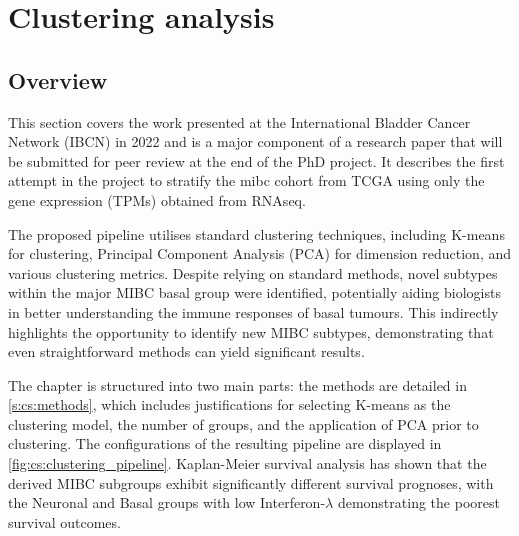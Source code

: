 \section{Clustering analysis} \label{s:clustering_analysis}

\vspace{3mm}
\vspace{3mm}

\subsection{Overview}

This section covers the work presented at the International Bladder Cancer Network (IBCN) in 2022 and is a major component of a research paper that will be submitted for peer review at the end of the PhD project. It describes the first attempt in the project to stratify the \acrfull{mibc} cohort from TCGA using only the gene expression (TPMs) obtained from RNAseq.

The proposed pipeline utilises standard clustering techniques, including K-means for clustering, Principal Component Analysis (PCA) for dimension reduction, and various clustering metrics. Despite relying on standard methods, novel subtypes within the major MIBC basal group were identified, potentially aiding biologists in better understanding the immune responses of basal tumours. This indirectly highlights the opportunity to identify new MIBC subtypes, demonstrating that even straightforward methods can yield significant results.



The chapter is structured into two main parts: the methods are detailed in \cref{s:cs:methods}, which includes justifications for selecting K-means as the clustering model, the number of groups, and the application of PCA prior to clustering. The configurations of the resulting pipeline are displayed in \cref{fig:cs:clustering_pipeline}. Kaplan-Meier survival analysis has shown that the derived MIBC subgroups exhibit significantly different survival prognoses, with the Neuronal and Basal groups with low Interferon-$\lambda$ demonstrating the poorest survival outcomes.

